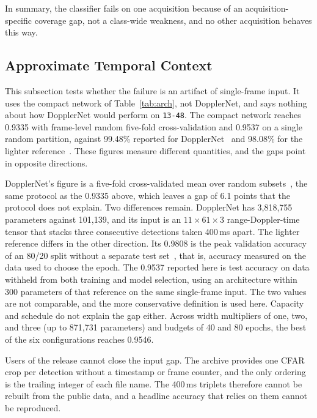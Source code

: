 \documentclass{ICIC2026}
\begin{document}
In summary, the classifier fails on one acquisition because of an acquisition-specific coverage gap, not a class-wide weakness, and no other acquisition behaves this way.

\subsection{Approximate Temporal Context}
\label{sec:inputgap}

This subsection tests whether the failure is an artifact of single-frame input. It uses the compact network of Table~\ref{tab:arch}, not DopplerNet, and says nothing about how DopplerNet would perform on \texttt{13-48}. The compact network reaches 0.9335 with frame-level random five-fold cross-validation and 0.9537 on a single random partition, against 99.48\% reported for DopplerNet~\cite{roldan2020} and 98.08\% for the lighter reference~\cite{zhang2025}. These figures measure different quantities, and the gaps point in opposite directions.

DopplerNet's figure is a five-fold cross-validated mean over random subsets~\cite{roldan2020}, the same protocol as the 0.9335 above, which leaves a gap of 6.1 points that the protocol does not explain. Two differences remain. DopplerNet has 3,818,755 parameters against 101,139, and its input is an $11 \times 61 \times 3$ range-Doppler-time tensor that stacks three consecutive detections taken 400\,ms apart. The lighter reference differs in the other direction. Its 0.9808 is the peak validation accuracy of an 80/20 split without a separate test set~\cite{zhang2025}, that is, accuracy measured on the data used to choose the epoch. The 0.9537 reported here is test accuracy on data withheld from both training and model selection, using an architecture within 300 parameters of that reference on the same single-frame input. The two values are not comparable, and the more conservative definition is used here. Capacity and schedule do not explain the gap either. Across width multipliers of one, two, and three (up to 871,731 parameters) and budgets of 40 and 80 epochs, the best of the six configurations reaches 0.9546.

Users of the release cannot close the input gap. The archive provides one CFAR crop per detection without a timestamp or frame counter, and the only ordering is the trailing integer of each file name. The 400\,ms triplets therefore cannot be rebuilt from the public data, and a headline accuracy that relies on them cannot be reproduced.
\end{document}
